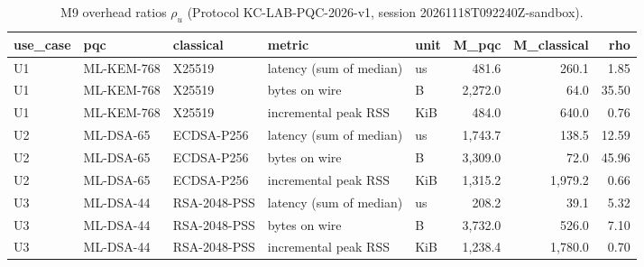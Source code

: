 \begin{table}[ht]
\centering
\caption{M9 overhead ratios $\rho_u$ (Protocol KC-LAB-PQC-2026-v1, session 20261118T092240Z-sandbox).}
\label{tab:t5}
\small
\begin{tabular}{@{}lllllrrr@{}}
\toprule
use\_case & pqc & classical & metric & unit & M\_pqc & M\_classical & rho \\
\midrule
U1 & ML-KEM-768 & X25519 & latency (sum of median) & us & 481.6 & 260.1 & 1.85 \\
U1 & ML-KEM-768 & X25519 & bytes on wire & B & 2,272.0 & 64.0 & 35.50 \\
U1 & ML-KEM-768 & X25519 & incremental peak RSS & KiB & 484.0 & 640.0 & 0.76 \\
U2 & ML-DSA-65 & ECDSA-P256 & latency (sum of median) & us & 1,743.7 & 138.5 & 12.59 \\
U2 & ML-DSA-65 & ECDSA-P256 & bytes on wire & B & 3,309.0 & 72.0 & 45.96 \\
U2 & ML-DSA-65 & ECDSA-P256 & incremental peak RSS & KiB & 1,315.2 & 1,979.2 & 0.66 \\
U3 & ML-DSA-44 & RSA-2048-PSS & latency (sum of median) & us & 208.2 & 39.1 & 5.32 \\
U3 & ML-DSA-44 & RSA-2048-PSS & bytes on wire & B & 3,732.0 & 526.0 & 7.10 \\
U3 & ML-DSA-44 & RSA-2048-PSS & incremental peak RSS & KiB & 1,238.4 & 1,780.0 & 0.70 \\
\bottomrule
\end{tabular}
\end{table}
